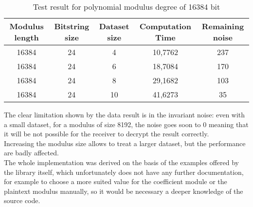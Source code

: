 \documentclass[10pt]{extarticle}
\begin{document}
\begin{table}[h]
	\begin{tabular}{||c|c|c|c|c||}
		\hline
		Modulus length & Bitstring size	& Dataset size	& Computation Time	& Remaining noise\\
		\hline\hline
		16384 & 24 & 4 & 10,7762 & 237\\
		\hline
		16384 & 24 & 6 & 18,7084 & 170 \\
		\hline
		16384 & 24 & 8 & 29,1682 & 103 \\
		\hline
		16384 & 24 & 10 & 41,6273 & 35 \\
		\hline
	\end{tabular}
\caption{Test result for polynomial modulus degree of 16384 bit}
\end{table}
The clear limitation shown by the data result is in the invariant noise: even with a small dataset, for a modulus of size 8192, the noise goes soon to 0 meaning that it will be not possible for the receiver to decrypt the result correctly.\\Increasing the modulus size allows to treat a larger dataset, but the performance are badly affected.\\The whole implementation was derived on the basis of the examples offered by the library itself, which unfortunately does not have any further documentation, for example to choose a more suited value for the coefficient module or the plaintext modulus manually, so it would be necessary a deeper knowledge of the source code.
\end{document}
